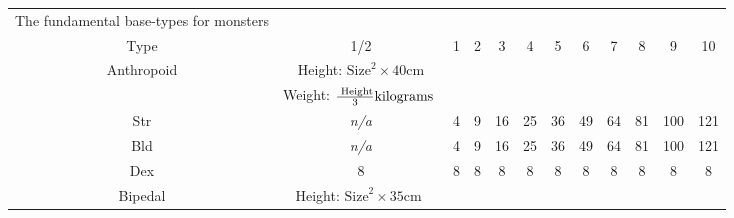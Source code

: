 \documentclass[twoside]{book}
\begin{document}
\begin{table}[htb]
  \begin{center}

  \begin{tabular}{|c|c|c|c|c|c|c|c|c|c|c|c|}
  \hline
    
  \textscbf{}&
  \textscbf{}&
  \textscbf{}&
  \textscbf{}&
  \textscbf{}&
  \textscbf{}&
  \textscbf{}&
  \textscbf{}&
  \textscbf{}&
  \textscbf{}&
  \textscbf{}&
  \textscbf{}\\
  \hline
  \hline
      
                    The fundamental base-types for monsters
                  \\

\hline

 Type & 1/2 & 1 & 2 & 3 & 4 & 5 & 6 & 7 & 8 & 9 & 10 \\

\hline

 Anthropoid &  Height: \begin{math}    
                        {\textrm{Size}}^{ 2 }   \times     40 \textrm{
                           cm}    \end{math}
                  \\

\hline

&  Weight: \begin{math}    {{\textrm{
                     Height}}\over{ 3 }}  \textrm{kilograms
                    }    \end{math}
                  \\

\hline

 Str &
                    \textit{n/a}
                  & 4 & 9 & 16 & 25 & 36 & 49 & 64 & 81 & 100 & 121 \\

\hline

 Bld &
                    \textit{n/a}
                  & 4 & 9 & 16 & 25 & 36 & 49 & 64 & 81 & 100 & 121 \\

\hline

 Dex & 8 & 8 & 8 & 8 & 8 & 8 & 8 & 8 & 8 & 8 & 8 \\

\hline

 Bipedal &  Height: \begin{math}    
                        {\textrm{Size}}^{ 2 }   \times   35 \textrm{cm
                          }    \end{math}
                  \\


\end{tabular}
\end{center}
\end{table}
\end{document}
